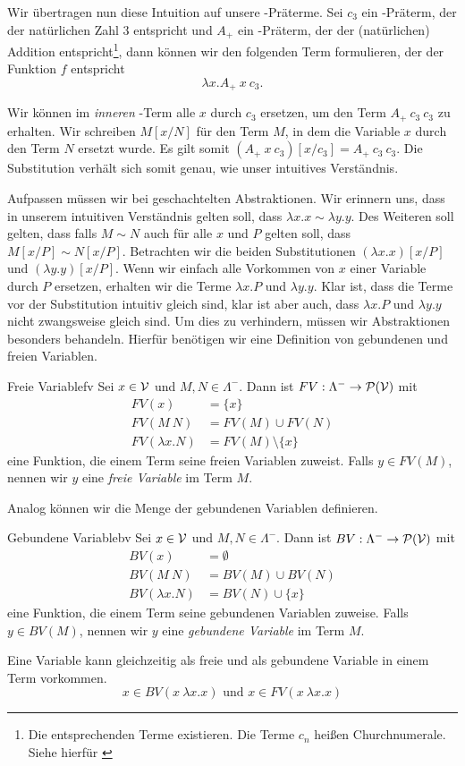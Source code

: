 Wir übertragen nun diese Intuition auf unsere \tlambda-Präterme. Sei $c_3$ ein \tlambda-Präterm, der der natürlichen Zahl $3$ entspricht und $A_+$ ein \tlambda-Präterm, der der (natürlichen) Addition entspricht\footnote{Die entsprechenden Terme existieren. Die Terme $c_n$ heißen Churchnumerale. Siehe hierfür \cite{lecturesCH}}, dann können wir den folgenden Term formulieren, der der Funktion $f$ entspricht \[\lambda x. A_+~x~c_3.\]


Wir können im \emph{inneren} \tlambda-Term alle $x$ durch $c_3$ ersetzen, um den Term $A_+~c_3~c_3$ zu erhalten. Wir schreiben $M[x/N]$ für den Term $M$, in dem die Variable $x$ durch den Term $N$ ersetzt wurde. Es gilt somit $(A_+~x~c_3)[x/c_3]=A_+~c_3~c_3$. Die Substitution verhält sich somit genau, wie unser intuitives Verständnis.

Aufpassen müssen wir bei geschachtelten Abstraktionen. Wir erinnern uns, dass in unserem intuitiven Verständnis gelten soll, dass $\lambda x.x\sim\lambda y.y$. Des Weiteren soll gelten, dass falls $M\sim N$ auch für alle $x$ und $P$ gelten soll, dass $M[x/P]\sim N[x/P]$. Betrachten wir die beiden Substitutionen $(\lambda x.x)[x/P]$ und $(\lambda y.y)[x/P]$. Wenn wir einfach alle Vorkommen von $x$ einer Variable durch $P$ ersetzen, erhalten wir die Terme $\lambda x.P$ und $\lambda y.y$. Klar ist, dass die Terme vor der Substitution intuitiv gleich sind, klar ist aber auch, dass $\lambda x.P$ und $\lambda y.y$ nicht zwangsweise gleich sind.
Um dies zu verhindern, müssen wir Abstraktionen besonders behandeln. Hierfür benötigen wir eine Definition von gebundenen und freien Variablen.
\begin{definition}{Freie Variable}{fv}
Sei $x\in\mathcal{V}$ und $M,N\in\Lambda^-$. Dann ist $FV:\Lambda^-\to\mathcal{P}(\mathcal{V})$ mit 
\begin{align*}
FV(x) &= \{x\}\\
FV(M~N) &= FV(M)\cup FV(N)\\
FV(\lambda x.N) &= FV(M)\setminus \{x\}
\end{align*} eine Funktion, die einem Term seine freien Variablen zuweist.
Falls $y\in FV(M)$, nennen wir $y$ eine \emph{freie Variable} im Term $M$.
\end{definition}
Analog können wir die Menge der gebundenen Variablen definieren.
\begin{definition}{Gebundene Variable}{bv}
Sei $x\in\mathcal{V}$ und $M,N\in\Lambda^-$. Dann ist $BV:\Lambda^-\to\mathcal{P}(\mathcal{V})$ mit
    \begin{align*}
    BV(x) &= \emptyset\\
    BV(M~N) &= BV(M)\cup BV(N)\\
    BV(\lambda x.N) &= BV(N)\cup\{x\}
    \end{align*} eine Funktion, die einem Term seine gebundenen Variablen zuweise.
    Falls $y\in BV(M)$, nennen wir $y$ eine \emph{gebundene Variable} im Term $M$.
\end{definition}
\begin{remark}
    Eine Variable kann gleichzeitig als freie und als gebundene Variable in einem Term vorkommen.
    \[x\in BV(x~\lambda x.x) \text{ und } x\in FV(x~\lambda x.x)\]
\end{remark}

